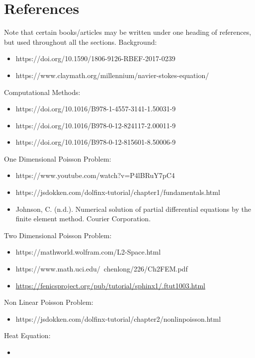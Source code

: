 \documentclass{article}
\begin{document}
\section{References}
Note that certain books/articles may be written under one heading of references, but used throughout all the sections.
Background:
\begin{itemize}
\item https://doi.org/10.1590/1806-9126-RBEF-2017-0239
\item https://www.claymath.org/millennium/navier-stokes-equation/
\end{itemize}
Computational Methods:
\begin{itemize}
\item https://doi.org/10.1016/B978-1-4557-3141-1.50031-9
\item https://doi.org/10.1016/B978-0-12-824117-2.00011-9
\item https://doi.org/10.1016/B978-0-12-815601-8.50006-9
\end{itemize}
One Dimensional Poisson Problem:
\begin{itemize}
\item https://www.youtube.com/watch?v=P4lBRuY7pC4
\item https://jsdokken.com/dolfinx-tutorial/chapter1/fundamentals.html
\item Johnson, C. (n.d.). Numerical solution of partial differential equations by the finite element method. Courier Corporation.
\end{itemize}
Two Dimensional Poisson Problem:
\begin{itemize}
\item https://mathworld.wolfram.com/L2-Space.html
\item https://www.math.uci.edu/~chenlong/226/Ch2FEM.pdf
\item\href{https://fenicsproject.org/pub/tutorial/sphinx1/._ftut1003.html}{https://fenicsproject.org/pub/tutorial/sphinx1/.ftut1003.html}
\end{itemize}
Non Linear Poisson Problem:
\begin{itemize}
\item https://jsdokken.com/dolfinx-tutorial/chapter2/nonlinpoisson.html
\end{itemize}
Heat Equation:
\begin{itemize}
\item 
\end{itemize}
\end{document}
